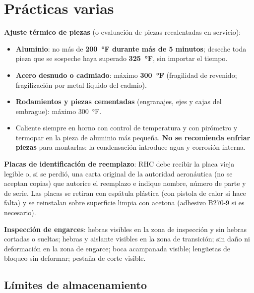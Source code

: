 \section{Prácticas varias}

\textbf{Ajuste térmico de piezas} (o evaluación de piezas recalentadas en servicio):
\begin{itemize}
\item \textbf{Aluminio}: no más de \textbf{200~°F durante más de 5 minutos}; deseche toda pieza que se sospeche haya superado \textbf{325~°F}, sin importar el tiempo.
\item \textbf{Acero desnudo o cadmiado}: máximo \textbf{300~°F} (fragilidad de revenido; fragilización por metal líquido del cadmio).
\item \textbf{Rodamientos y piezas cementadas} (engranajes, ejes y cajas del embrague): máximo 300~°F.
\item Caliente siempre en horno con control de temperatura y con pirómetro y termopar en la pieza de aluminio más pequeña. \textbf{No se recomienda enfriar piezas} para montarlas: la condensación introduce agua y corrosión interna.
\end{itemize}

\textbf{Placas de identificación de reemplazo}: RHC debe recibir la placa vieja legible o, si se perdió, una carta original de la autoridad aeronáutica (no se aceptan copias) que autorice el reemplazo e indique nombre, número de parte y de serie. Las placas se retiran con espátula plástica (con pistola de calor si hace falta) y se reinstalan sobre superficie limpia con acetona (adhesivo B270-9 si es necesario).

\textbf{Inspección de engarces}: hebras visibles en la zona de inspección y sin hebras cortadas o sueltas; hebras y aislante visibles en la zona de transición; sin daño ni deformación en la zona de engarce; boca acampanada visible; lengüetas de bloqueo sin deformar; pestaña de corte visible.

\subsection{Límites de almacenamiento}

